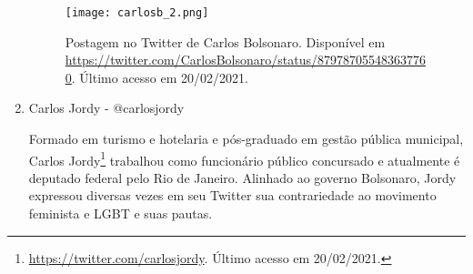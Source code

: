 \documentclass[
	12pt,				%
	openright,			%
	twoside,			%
	a4paper,			%
	english,			%
	brazil				%
	]{abntex2}
\begin{document}
\begin{anexosenv}
\begin{enumerate}
 \begin{figure}[!htbp]
    \centering
    \texttt{[image: carlosb\_2.png]}
    \caption{Postagem no Twitter de Carlos Bolsonaro. Disponível em \url{https://twitter.com/CarlosBolsonaro/status/879787055483637760}. Último acesso em 20/02/2021.}
    \label{fig:carlosb1}
 \end{figure}
 
 
 
  
  \item Carlos Jordy - @carlosjordy
  
  Formado em turismo e hotelaria e pós-graduado em gestão pública municipal, Carlos Jordy\footnote{\url{https://twitter.com/carlosjordy}. Último acesso em 20/02/2021.} trabalhou como funcionário público concursado e atualmente é deputado federal pelo Rio de Janeiro. Alinhado ao governo Bolsonaro, Jordy expressou diversas vezes em seu Twitter sua contrariedade ao movimento feminista e LGBT e suas pautas.
 
 

\end{enumerate}
\end{anexosenv}
\end{document}
